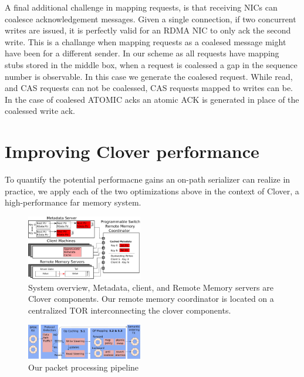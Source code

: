 A final additional challenge in mapping
requests, is that receiving NICs can coalesce acknowledgement messages. Given a
single connection, if two concurrent writes are issued, it is perfectly valid
for an RDMA NIC to only ack the second write. This is a challange when mapping
requests as a coalesed message might have been for a different sender. In our
scheme as all requests have mapping stubs stored in the middle box, when a
request is coalessed a gap in the sequence number is observable. In this case we
generate the coalesed request. While read, and CAS requests can not be
coalessed, CAS requests mapped to writes can be. In the case of coalesed ATOMIC
acks an atomic ACK is generated in place of the coalessed write ack.

\section{Improving Clover performance}

To quantify the potential performacne gains an on-path serializer can
realize in practice, we apply each of the two optimizations above in
the context of Clover, a high-performance far memory system.


\begin{figure}
    \includegraphics[width=0.45\textwidth]{fig/overview.pdf}
    \caption{ System overview, Metadata, client, and Remote Memory
    servers are Clover components. Our remote memory coordinator is
    located on a centralized TOR interconnecting the clover components.
    }
    \label{fig:overview} 
\end{figure}

\begin{figure}
    \includegraphics[width=0.45\textwidth]{fig/packet_processing.pdf}
    \caption{Our packet processing pipeline}
    \label{fig:system}
\end{figure}


